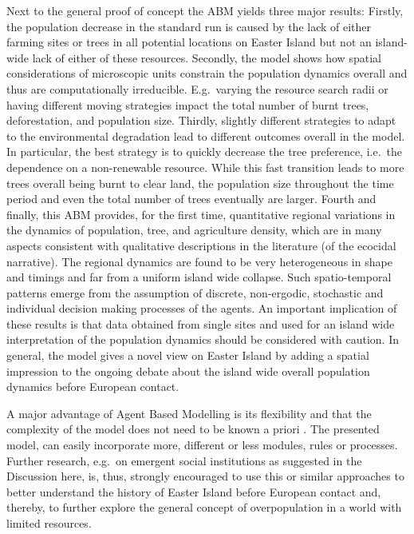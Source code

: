 Next to the general proof of concept the ABM yields three major results:
Firstly, the population decrease in the standard run is caused by the lack of either farming sites or trees in all potential locations on Easter Island but not an island-wide lack of either of these resources.
Secondly, the model shows how spatial considerations of microscopic units constrain the population dynamics overall and thus are computationally irreducible.
E.g.\ varying the resource search radii or having different moving strategies impact the total number of burnt trees, deforestation, and population size.
Thirdly, slightly different strategies to adapt to the environmental degradation lead to different outcomes overall in the model. 
In particular, the best strategy is to quickly decrease the tree preference, i.e.\ the dependence on a non-renewable resource. While this fast transition leads to more trees overall being burnt to clear land, the population size throughout the time period and even the total number of trees eventually are larger. 
Fourth and finally, this ABM provides, for the first time, quantitative regional variations in the dynamics of population, tree, and agriculture density, which are in many aspects consistent with qualitative descriptions in the literature (of the ecocidal narrative).
The regional dynamics are found to be very heterogeneous in shape and timings and far from a uniform island wide collapse.
Such spatio-temporal patterns emerge from the assumption of discrete, non-ergodic, stochastic and individual decision making processes of the agents.
An important implication of these results is that data obtained from single sites and used for an island wide interpretation of the population dynamics should be considered with caution.
In general, the model gives a novel view on Easter Island by adding a spatial impression to the ongoing debate about the island wide overall population dynamics before European contact.


A major advantage of Agent Based Modelling is its flexibility and that the complexity of the model does not need to be known a priori \citep{Bonabeau2002}.
The presented model, can easily incorporate more, different or less modules, rules or processes.
Further research, e.g.\ on emergent social institutions as suggested in the Discussion here, is, thus, strongly encouraged to use this or similar approaches to better understand the history of Easter Island before European contact and, thereby, to further explore the general concept of overpopulation in a world with limited resources.

